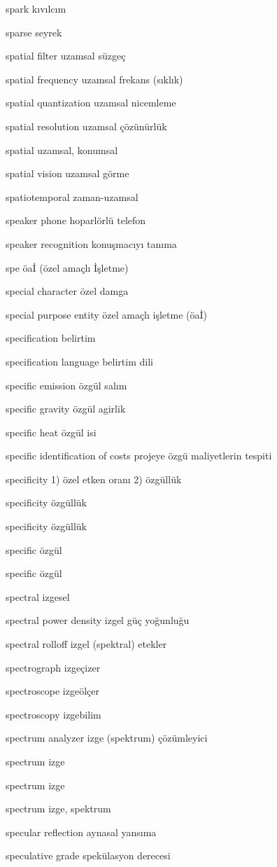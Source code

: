 \documentclass[12pt,fleqn]{article}\usepackage{../../common}
\begin{document}
spark kıvılcım

sparse seyrek

spatial filter uzamsal süzgeç

spatial frequency uzamsal frekans (sıklık)

spatial quantization uzamsal nicemleme

spatial resolution uzamsal çözünürlük

spatial uzamsal, konumsal

spatial vision uzamsal görme

spatiotemporal zaman-uzamsal

speaker phone hoparlörlü telefon

speaker recognition konuşmacıyı tanıma

spe öaİ (özel amaçlı İşletme)

special character özel damga

special purpose entity özel amaçlı işletme (öaİ)

specification belirtim

specification language belirtim dili

specific emission özgül salım

specific gravity özgül agirlik

specific heat özgül isi

specific identification of costs projeye özgü maliyetlerin tespiti

specificity 1) özel etken oranı 2) özgüllük

specificity özgüllük

specificity özgüllük

specific özgül

specific özgül

spectral izgesel

spectral power density izgel güç yoğunluğu

spectral rolloff izgel (spektral) etekler

spectrograph izgeçizer

spectroscope izgeölçer

spectroscopy izgebilim

spectrum analyzer izge (spektrum) çözümleyici

spectrum izge

spectrum izge

spectrum izge, spektrum

specular reflection aynasal yansıma

speculative grade spekülasyon derecesi
\end{document}
